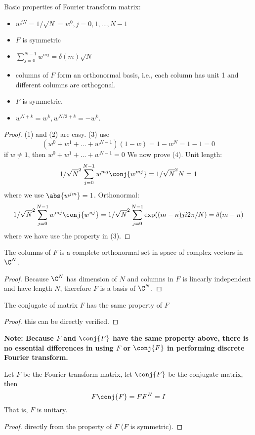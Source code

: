 \begin{refsection}
\begin{lemma}
	Basic properties of Fourier transform matrix:
	\begin{itemize}
		\item $w^{jN} = 1/\sqrt{N} = w^0,j=0,1,...,N-1$
		\item $F$ is symmetric
		\item $\sum_{j=0}^{N-1} w^{mj} = \delta(m)\sqrt{N}$
		\item columns of $F$ form an orthonormal basis, i.e., each column has unit 1 and different columns are orthogonal.
		\item $F$ is symmetric.
		\item $w^{N+k} = w^k, w^{N/2 + k} = - w^{k}$.
	\end{itemize}
\end{lemma}
\begin{proof}
	(1) and (2) are easy. (3) use
	$$(w^0+w^1+...+w^{N-1})(1-w)=1-w^N = 1-1 = 0$$
	if $w\neq 1$, then $w^0+w^1+...+w^{N-1} = 0$
	We now prove (4). Unit length: $$1/\sqrt{N}^2\sum_{j=0}^{N-1} w^{mj} \conj{w^{mj}} = 1/\sqrt{N}^2 N = 1$$
	where we use $\abs{w^{jm}} = 1$.
	Orthonormal: $$1/\sqrt{N}^2\sum_{j=0}^{N-1} w^{mj} \conj{w^{nj}}=1/\sqrt{N}^2\sum_{j=0}^{N-1} \exp((m-n)ji2\pi/N) = \delta(m-n) $$
	where we have use the property in (3).	
\end{proof}


\begin{theorem}
	The columns of $F$ is a complete orthonormal set in space of complex vectors in $\C^N$.
\end{theorem}
\begin{proof}
	Because $\C^N$ has dimension of $N$ and columns in $F$ is linearly independent and have length $N$, therefore $F$ is a basis of $\C^N$.	
\end{proof}


\begin{lemma}
	The conjugate of matrix $F$ has the same property of $F$
\end{lemma}
\begin{proof}
	this can be directly verified.	
\end{proof}


\begin{mdframed}
	\textbf{Note: Because $F$ and $\conj{F}$ have the same property above, there is no essential differences in using $F$ or $\conj{F}$ in performing discrete Fourier transform.}
\end{mdframed}

\begin{lemma}
	Let $F$ be the Fourier transform matrix, let $\conj{F}$ be the conjugate matrix, then $$F\conj{F} = FF^H = I$$
	That is, $F$ is unitary.
\end{lemma}
\begin{proof}
	directly from the property of $F$ ($F$ is symmetric).	
\end{proof}




\end{refsection}
